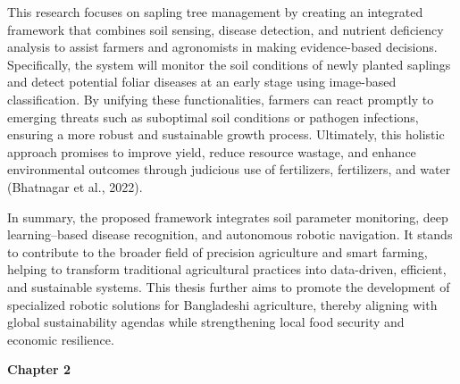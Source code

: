 \documentclass{book} %
\begin{document}
\noindent This research focuses on sapling tree management by creating an integrated framework that combines soil sensing, disease detection, and nutrient deficiency analysis to assist farmers and agronomists in making evidence-based decisions. Specifically, the system will monitor the soil conditions of newly planted saplings and detect potential foliar diseases at an early stage using image-based classification. By unifying these functionalities, farmers can react promptly to emerging threats such as suboptimal soil conditions or pathogen infections, ensuring a more robust and sustainable growth process. Ultimately, this holistic approach promises to improve yield, reduce resource wastage, and enhance environmental outcomes through judicious use of fertilizers, fertilizers, and water (Bhatnagar et al., 2022).

\noindent In summary, the proposed framework integrates soil parameter monitoring, deep learning--based disease recognition, and autonomous robotic navigation. It stands to contribute to the broader field of precision agriculture and smart farming, helping to transform traditional agricultural practices into data-driven, efficient, and sustainable systems. This thesis further aims to promote the development of specialized robotic solutions for Bangladeshi agriculture, thereby aligning with global sustainability agendas while strengthening local food security and economic resilience.

\noindent 

\noindent 

\noindent 

\noindent 

\noindent 

\noindent 

\noindent 

\noindent 

\noindent \textbf{}

\noindent \eject \textbf{}

\noindent \textbf{Chapter 2}
\end{document}
